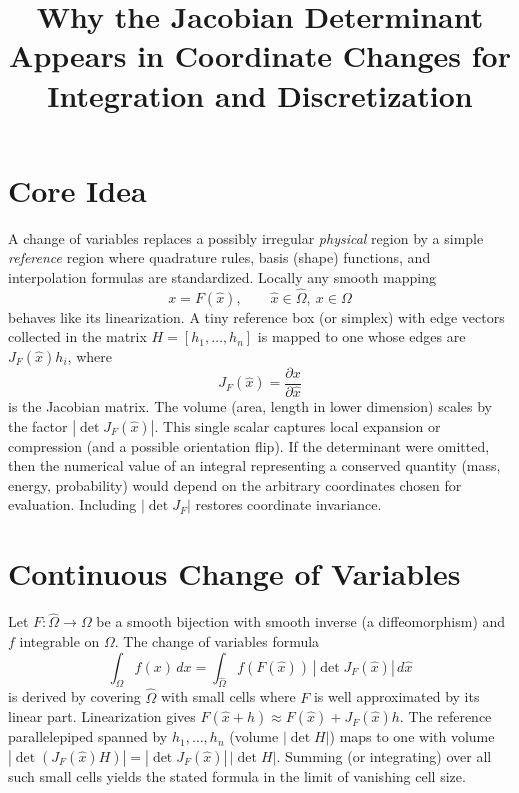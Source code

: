 \documentclass[11pt]{article}
\title{Why the Jacobian Determinant Appears in Coordinate Changes for Integration and Discretization}
\author{}
\date{}
\begin{document}
\maketitle

\begin{center}
\end{center}

\section{Core Idea}
A change of variables replaces a possibly irregular \emph{physical} region by a simple \emph{reference} region where quadrature rules, basis (shape) functions, and interpolation formulas are standardized. Locally any smooth mapping
\[
x = F(\hat x), \qquad \hat x \in \hat\Omega,\ x\in\Omega
\]
behaves like its linearization. A tiny reference box (or simplex) with edge vectors collected in the matrix $H=[h_1,\dots,h_n]$ is mapped to one whose edges are $J_F(\hat x)h_i$, where
\[
J_F(\hat x)=\frac{\partial x}{\partial \hat x}
\]
is the Jacobian matrix. The volume (area, length in lower dimension) scales by the factor $|\det J_F(\hat x)|$. This single scalar captures local expansion or compression (and a possible orientation flip). If the determinant were omitted, then the numerical value of an integral representing a conserved quantity (mass, energy, probability) would depend on the arbitrary coordinates chosen for evaluation. Including $|\det J_F|$ restores coordinate invariance.

\section{Continuous Change of Variables}
Let $F:\hat\Omega\to\Omega$ be a smooth bijection with smooth inverse (a diffeomorphism) and $f$ integrable on $\Omega$. The change of variables formula
\[
\int_{\Omega} f(x)\,dx = \int_{\hat \Omega} f(F(\hat x))\, |\det J_F(\hat x)|\, d\hat x
\]
is derived by covering $\hat\Omega$ with small cells where $F$ is well approximated by its linear part. Linearization gives $F(\hat x+h)\approx F(\hat x)+J_F(\hat x)h$. The reference parallelepiped spanned by $h_1,\dots,h_n$ (volume $|\det H|$) maps to one with volume $|\det(J_F(\hat x)H)| = |\det J_F(\hat x)|\,|\det H|$. Summing (or integrating) over all such small cells yields the stated formula in the limit of vanishing cell size.
\end{document}
